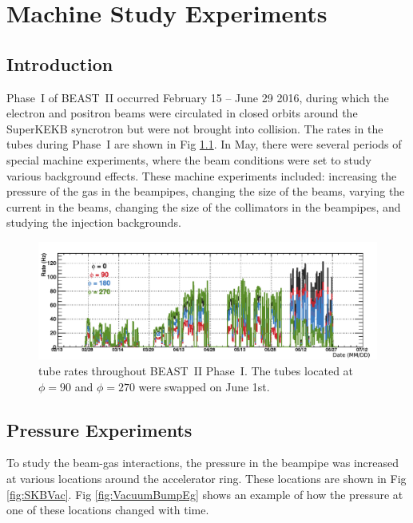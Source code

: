 


\chapter{Machine Study Experiments}
\label{chap:machStudies}

\section{Introduction}

	Phase~I of BEAST~II occurred February 15 -- June 29 2016, during which the electron and positron beams were circulated in closed orbits around the SuperKEKB syncrotron but were not brought into collision. The rates in the \he tubes during Phase~I are shown in Fig \ref{fig:RateAll}.  In May, there were several periods of special machine experiments, where the beam conditions were set to study various background effects. These machine experiments included:  increasing the pressure of the gas in the beampipes, changing the size of the beams, varying the current in the beams, changing the size of the collimators in the beampipes, and studying the injection backgrounds.



\begin{figure}[htb]
	\centerfloat
		\includegraphics[trim={0 0 0 0.3cm},clip, width=\textwidth]{images/Rate_AllPhaseI}
	\caption[\He tube rates throughout BEAST~II Phase~I]{\He tube rates throughout BEAST~II Phase~I. The tubes located at $\phi=90$ and $\phi=270$ were swapped on June 1st.}	
	\label{fig:RateAll}
\end{figure}




\section{Pressure Experiments}


	To study the beam-gas interactions, the pressure in the beampipe was increased at various locations around the accelerator ring. These locations are shown in Fig \ref{fig:SKBVac}. Fig \ref{fig:VacuumBumpEg} shows an example of how the pressure at one of these locations changed with time.

